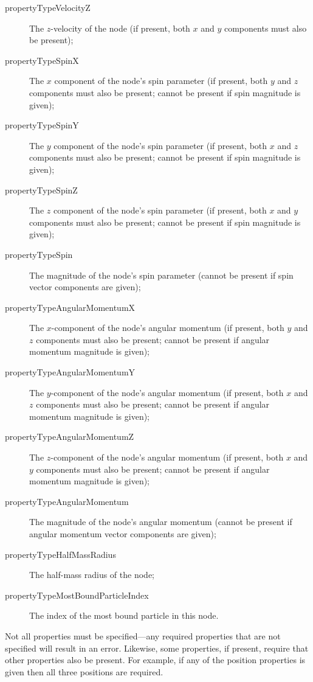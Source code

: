 \begin{description}
 \item [{\normalfont \ttfamily propertyTypeVelocityZ}] The $z$-velocity of the node (if present, both $x$ and $y$ components must also be present);
 \item [{\normalfont \ttfamily propertyTypeSpinX}] The $x$ component of the node's spin parameter (if present, both $y$ and $z$ components must also be present; cannot be present if spin magnitude is given);
 \item [{\normalfont \ttfamily propertyTypeSpinY}] The $y$ component of the node's spin parameter (if present, both $x$ and $z$ components must also be present; cannot be present if spin magnitude is given);
 \item [{\normalfont \ttfamily propertyTypeSpinZ}] The $z$ component of the node's spin parameter (if present, both $x$ and $y$ components must also be present; cannot be present if spin magnitude is given);
 \item [{\normalfont \ttfamily propertyTypeSpin}] The magnitude of the node's spin parameter (cannot be present if spin vector components are given);          
 \item [{\normalfont \ttfamily propertyTypeAngularMomentumX}] The $x$-component of the node's angular momentum (if present, both $y$ and $z$ components must also be present; cannot be present if angular momentum magnitude is given);
 \item [{\normalfont \ttfamily propertyTypeAngularMomentumY}] The $y$-component of the node's angular momentum (if present, both $x$ and $z$ components must also be present; cannot be present if angular momentum magnitude is given);
 \item [{\normalfont \ttfamily propertyTypeAngularMomentumZ}] The $z$-component of the node's angular momentum (if present, both $x$ and $y$ components must also be present; cannot be present if angular momentum magnitude is given);
 \item [{\normalfont \ttfamily propertyTypeAngularMomentum}] The magnitude of the node's angular momentum (cannot be present if angular momentum vector components are given);
 \item [{\normalfont \ttfamily propertyTypeHalfMassRadius}] The half-mass radius of the node;
 \item [{\normalfont \ttfamily propertyTypeMostBoundParticleIndex}] The index of the most bound particle in this node.
\end{description}
Not all properties must be specified---any required properties that are not specified will result in an error. Likewise, some properties, if present, require that other properties also be present. For example, if any of the position properties is given then all three positions are required.\\

